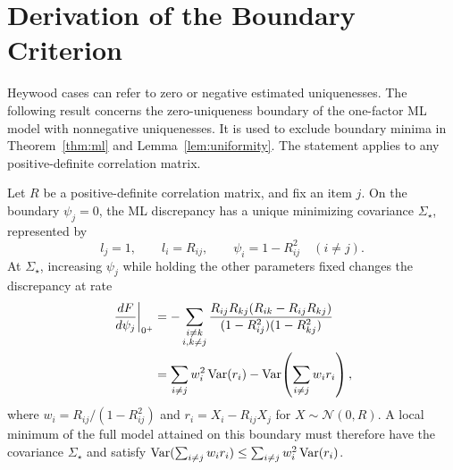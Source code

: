 \section{Derivation of the Boundary Criterion}
\label{app:heywood-proof}

Heywood cases can refer to zero or negative estimated uniquenesses. The following result concerns the zero-uniqueness boundary of the one-factor ML model with nonnegative uniquenesses. It is used to exclude boundary minima in Theorem~\ref{thm:ml} and Lemma~\ref{lem:uniformity}. The statement applies to any positive-definite correlation matrix.

\begin{proposition}
\label{prop:boundary}
Let $R$ be a positive-definite correlation matrix, and fix an item $j$. On the boundary $\psi_j=0$, the ML discrepancy has a unique minimizing covariance $\Sigma_\star$, represented by
\[
l_j=1,\qquad l_i=R_{ij},\qquad
\psi_i=1-R_{ij}^2\quad(i\ne j).
\]
At $\Sigma_\star$, increasing $\psi_j$ while holding the other parameters fixed changes the discrepancy at rate
\[
\begin{aligned}
\left.\frac{dF}{d\psi_j}\right|_{0^+}
&=-\sum_{\substack{i\ne k\\i,k\ne j}}
\frac{R_{ij}R_{kj}(R_{ik}-R_{ij}R_{kj})}
{(1-R_{ij}^2)(1-R_{kj}^2)}\\
&=\sum_{i\ne j}w_i^2\operatorname{Var}(r_i)
-\operatorname{Var}\!\left(\sum_{i\ne j}w_i r_i\right),
\end{aligned}
\]
where $w_i=R_{ij}/(1-R_{ij}^2)$ and $r_i=X_i-R_{ij}X_j$ for $X\sim\mathcal N(0,R)$.
A local minimum of the full model attained on this boundary must therefore have the covariance $\Sigma_\star$ and satisfy
$\operatorname{Var}(\sum_{i\ne j}w_i r_i)\le\sum_{i\ne j}w_i^2\operatorname{Var}(r_i)$.
\end{proposition}

